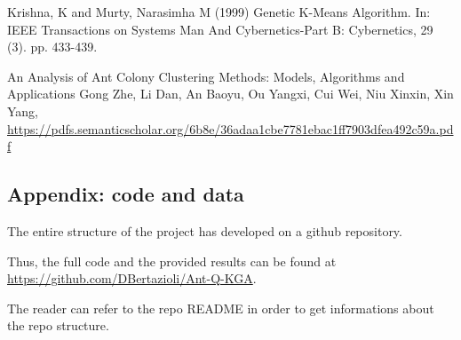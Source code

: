 \documentclass[10pt]{article}
\begin{document}
\begin{thebibliography}{9}
Krishna, K and Murty, Narasimha M (1999) Genetic K-Means Algorithm. In: IEEE Transactions on Systems Man And Cybernetics-Part B: Cybernetics, 29 (3). pp. 433-439.

An Analysis of Ant Colony Clustering Methods: Models, Algorithms and Applications Gong Zhe, Li Dan, An Baoyu, Ou Yangxi, Cui Wei, Niu Xinxin, Xin Yang, \url{https://pdfs.semanticscholar.org/6b8e/36adaa1cbe7781ebac1ff7903dfea492c59a.pdf}
\end{thebibliography}
\begin{appendix}
\appendix
\section{Appendix: code and data}
The entire structure of the project has developed on a github repository.

Thus, the full code and the provided results can be found at \url{https://github.com/DBertazioli/Ant-Q-KGA}.

The reader can refer to the repo README in order to get informations about the repo structure.
\end{appendix}
\end{document}
